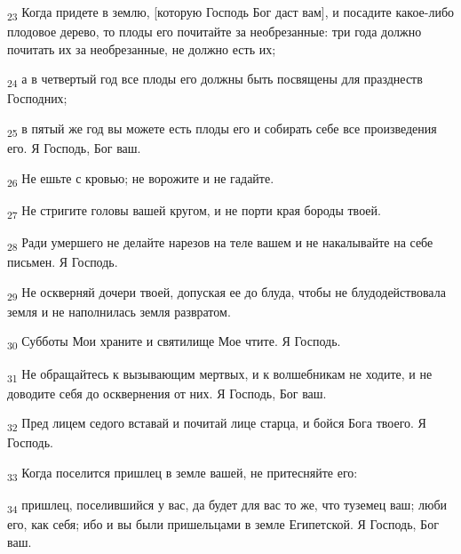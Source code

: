 \begin{tcolorbox}
\textsubscript{23} Когда придете в землю, [которую Господь Бог даст вам], и посадите какое-либо плодовое дерево, то плоды его почитайте за необрезанные: три года должно почитать их за необрезанные, не должно есть их;
\end{tcolorbox}
\begin{tcolorbox}
\textsubscript{24} а в четвертый год все плоды его должны быть посвящены для празднеств Господних;
\end{tcolorbox}
\begin{tcolorbox}
\textsubscript{25} в пятый же год вы можете есть плоды его и собирать себе все произведения его. Я Господь, Бог ваш.
\end{tcolorbox}
\begin{tcolorbox}
\textsubscript{26} Не ешьте с кровью; не ворожите и не гадайте.
\end{tcolorbox}
\begin{tcolorbox}
\textsubscript{27} Не стригите головы вашей кругом, и не порти края бороды твоей.
\end{tcolorbox}
\begin{tcolorbox}
\textsubscript{28} Ради умершего не делайте нарезов на теле вашем и не накалывайте на себе письмен. Я Господь.
\end{tcolorbox}
\begin{tcolorbox}
\textsubscript{29} Не оскверняй дочери твоей, допуская ее до блуда, чтобы не блудодействовала земля и не наполнилась земля развратом.
\end{tcolorbox}
\begin{tcolorbox}
\textsubscript{30} Субботы Мои храните и святилище Мое чтите. Я Господь.
\end{tcolorbox}
\begin{tcolorbox}
\textsubscript{31} Не обращайтесь к вызывающим мертвых, и к волшебникам не ходите, и не доводите себя до осквернения от них. Я Господь, Бог ваш.
\end{tcolorbox}
\begin{tcolorbox}
\textsubscript{32} Пред лицем седого вставай и почитай лице старца, и бойся Бога твоего. Я Господь.
\end{tcolorbox}
\begin{tcolorbox}
\textsubscript{33} Когда поселится пришлец в земле вашей, не притесняйте его:
\end{tcolorbox}
\begin{tcolorbox}
\textsubscript{34} пришлец, поселившийся у вас, да будет для вас то же, что туземец ваш; люби его, как себя; ибо и вы были пришельцами в земле Египетской. Я Господь, Бог ваш.
\end{tcolorbox}
